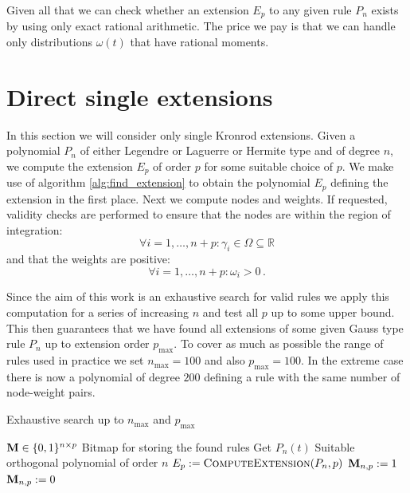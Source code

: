 \documentclass[a4paper,10pt]{article}
\begin{document}
Given all that we can check whether an extension $E_p$ to any given rule $P_n$
exists by using only exact rational arithmetic. The price we pay is that we can
handle only distributions $\omega(t)$ that have rational moments.





\FloatBarrier
\section{Direct single extensions}

In this section we will consider only single Kronrod extensions. Given a polynomial
$P_n$ of either Legendre or Laguerre or Hermite type and of degree $n$, we compute
the extension $E_p$ of order $p$ for some suitable choice of $p$. We make use of algorithm
\ref{alg:find_extension} to obtain the polynomial $E_p$ defining the extension in
the first place. Next we compute nodes and weights. If requested, validity checks
are performed to ensure that the nodes are within the region of integration:
\begin{equation}
  \forall i = 1, \ldots, n+p: \gamma_i \in \Omega \subseteq \mathbb{R}
\end{equation}
and that the weights are positive:
\begin{equation}
  \forall i = 1, \ldots, n+p: \omega_i > 0 \,.
\end{equation}

Since the aim of this work is an exhaustive search for valid rules we apply
this computation for a series of increasing $n$ and test all $p$ up to some
upper bound. This then guarantees that we have found all extensions of
some given Gauss type rule $P_n$ up to extension order $p_{\textrm{max}}$.
To cover as much as possible the range of rules used in practice we set
$n_{\mathrm{max}} = 100$ and also $p_{\textrm{max}} = 100$. In the extreme case
there is now a polynomial of degree $200$ defining a rule with the same number
of node-weight pairs.

\begin{algorithm}
  \caption{Exhaustive search up to $n_{\textrm{max}}$ and $p_{\textrm{max}}$}
  \label{alg:compute_weights}
  \begin{algorithmic}
      \State $\mathbf{M} \in \{0,1\}^{n \times p}$
      \Comment Bitmap for storing the found rules
        \State Get $P_n(t)$
        \Comment Suitable orthogonal polynomial of order $n$
          \State $E_p := \textsc{ComputeExtension}(P_n, p)$
            \State $\mathbf{M}_{n,p} := 1$
          \Else
            \State $\mathbf{M}_{n,p} := 0$
          \EndIf
        \EndFor
      \EndFor
    \EndProcedure
  \end{algorithmic}
\end{algorithm}
\end{document}
